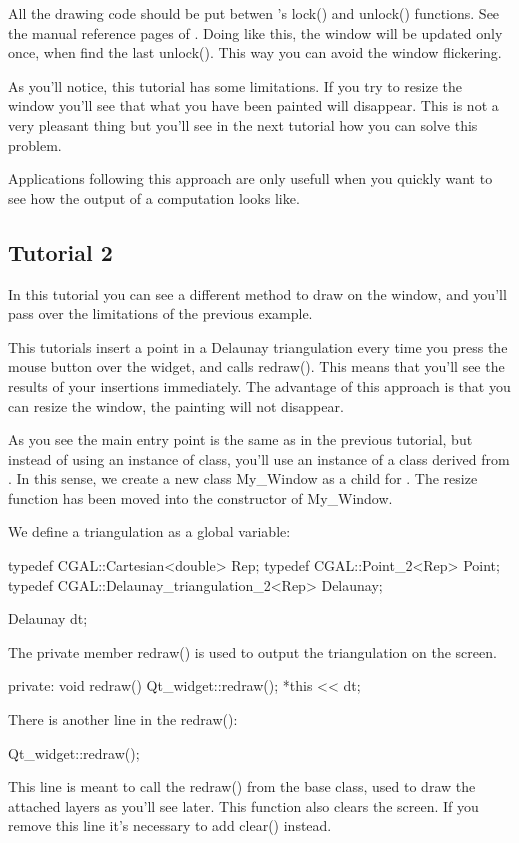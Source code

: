 All the drawing code should be put betwen 's lock() and
unlock() functions. See the manual reference pages of
. Doing like this, the window will be updated only
once, when  find the last unlock(). This way you can avoid the window flickering.

As you'll notice, this tutorial has some limitations. If you try to
resize the window you'll see that what you have been painted will
disappear. This is not a very pleasant thing but you'll see in the
next tutorial how you can solve this problem.

Applications following this approach are only usefull when you quickly
want to see how the output of a computation looks like.

\subsection*{Tutorial 2}

In this tutorial you can see a different method to draw on the window,
and you'll pass over the limitations of the previous example.

This tutorials insert a point in a Delaunay triangulation every time
you press the mouse button over the widget, and calls redraw(). This
means that you'll see the results of your insertions immediately. The
advantage of this approach is that you can resize the window, the
painting will not disappear.

As you see the main entry point is the same as in the previous
tutorial, but instead of using an instance of 
class, you'll use an instance of a class derived from .
In this sense, we create a new class My\_Window as a child for
. The resize function has been moved into the
constructor of My\_Window.

We define a triangulation as a global variable:
\begin{ccExampleCode}
typedef CGAL::Cartesian<double>             Rep;
typedef CGAL::Point_2<Rep>                  Point;
typedef CGAL::Delaunay_triangulation_2<Rep> Delaunay;

Delaunay dt;
\end{ccExampleCode}
The private member redraw() is used to output the triangulation on the screen. 
\begin{ccExampleCode}
private:
  void redraw()
  {
    Qt\_widget::redraw();
    *this << dt;
  }
\end{ccExampleCode}
There is another line in the redraw():
\begin{ccExampleCode}
Qt_widget::redraw();
\end{ccExampleCode}
This line is meant to call the redraw() from the 
base class, used to draw the attached layers as you'll see later. This function
also clears the screen. If you remove this line it's necessary to add
clear() instead.

